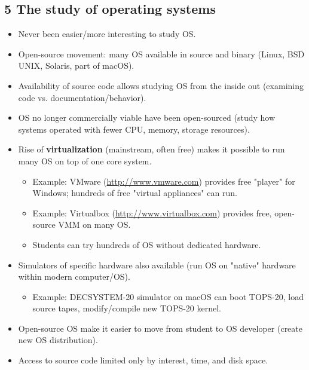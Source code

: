 \documentclass{article}
\begin{document}
\subsection*{5 The study of operating systems}
\begin{itemize}
    \item Never been easier/more interesting to study OS.
    \item Open-source movement: many OS available in source and binary (Linux, BSD UNIX, Solaris, part of macOS).
    \item Availability of source code allows studying OS from the inside out (examining code vs. documentation/behavior).
    \item OS no longer commercially viable have been open-sourced (study how systems operated with fewer CPU, memory, storage resources).
    \item Rise of \textbf{virtualization} (mainstream, often free) makes it possible to run many OS on top of one core system.
    \begin{itemize}
        \item Example: VMware (\url{http://www.vmware.com}) provides free "player" for Windows; hundreds of free "virtual appliances" can run.
        \item Example: Virtualbox (\url{http://www.virtualbox.com}) provides free, open-source VMM on many OS.
        \item Students can try hundreds of OS without dedicated hardware.
    \end{itemize}
    \item Simulators of specific hardware also available (run OS on "native" hardware within modern computer/OS).
    \begin{itemize}
        \item Example: DECSYSTEM-20 simulator on macOS can boot TOPS-20, load source tapes, modify/compile new TOPS-20 kernel.
    \end{itemize}
    \item Open-source OS make it easier to move from student to OS developer (create new OS distribution).
    \item Access to source code limited only by interest, time, and disk space.
\end{itemize}
\end{document}
